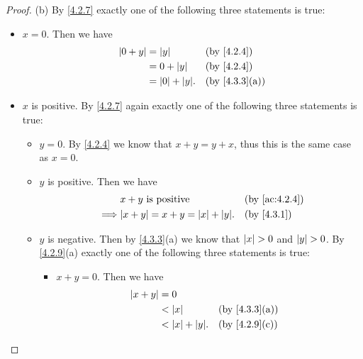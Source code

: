 \begin{proof}{(b)}
  By \cref{4.2.7} exactly one of the following three statements is true:
  \begin{itemize}
    \item \(x = 0\).
          Then we have
          \begin{align*}
            \abs{0 + y} & = \abs{y}            &  & \text{(by \cref{4.2.4})}    \\
                        & = 0 + \abs{y}        &  & \text{(by \cref{4.2.4})}    \\
                        & = \abs{0} + \abs{y}. &  & \text{(by \cref{4.3.3}(a))}
          \end{align*}
    \item \(x\) is positive.
          By \cref{4.2.7} again exactly one of the following three statements is true:
          \begin{itemize}
            \item \(y = 0\).
                  By \cref{4.2.4} we know that \(x + y = y + x\), thus this is the same case as \(x = 0\).
            \item \(y\) is positive.
                  Then we have
                  \begin{align*}
                             & x + y \text{ is positive}                &  & \text{(by \cref{ac:4.2.4})} \\
                    \implies & \abs{x + y} = x + y = \abs{x} + \abs{y}. &  & \text{(by \cref{4.3.1})}
                  \end{align*}
            \item \(y\) is negative.
                  Then by \cref{4.3.3}(a) we know that \(\left\lvert x\right\rvert > 0\) and \(\left\lvert y\right\rvert > 0\).
                  By \cref{4.2.9}(a) exactly one of the following three statements is true:
                  \begin{itemize}
                    \item \(x + y = 0\).
                          Then we have
                          \begin{align*}
                            \abs{x + y} & = 0                                                   \\
                                        & < \abs{x}            &  & \text{(by \cref{4.3.3}(a))} \\
                                        & < \abs{x} + \abs{y}. &  & \text{(by \cref{4.2.9}(c))}
                          \end{align*}

\end{itemize}
\end{itemize}
\end{itemize}
\end{proof}
